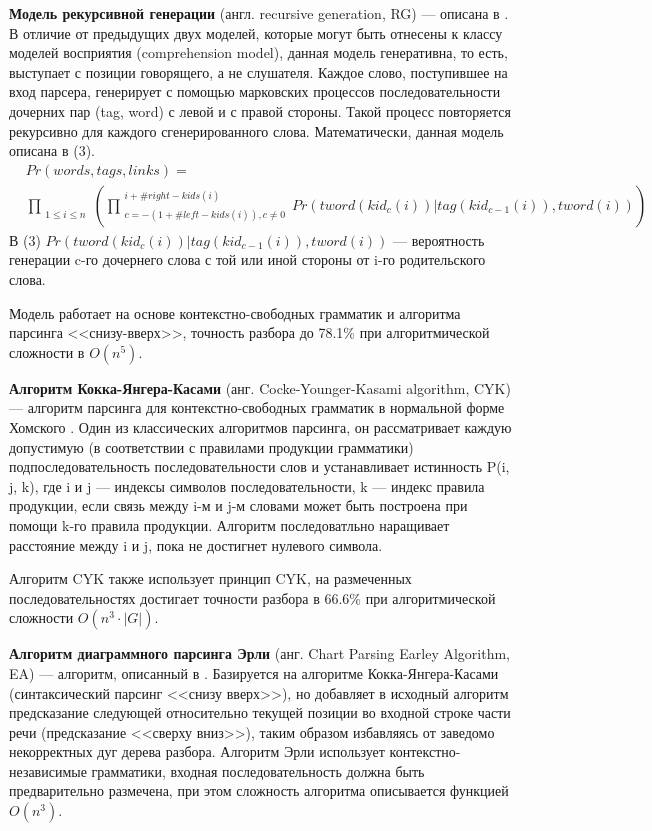 \textbf{Модель рекурсивной генерации} (англ. recursive generation, RG) --- описана в \cite{eisner}. В отличие от предыдущих двух моделей, которые могут быть отнесены к классу моделей восприятия (comprehension model), данная модель генеративна, то есть, выступает с позиции говорящего, а не слушателя. Каждое слово, поступившее на вход парсера, генерирует с помощью марковских процессов последовательности дочерних пар (tag, word) с левой и с правой стороны. Такой процесс повторяется рекурсивно для каждого сгенерированного слова. Математически, данная модель описана в (3).
\begin{equation}\begin{split}
	& Pr(words, tags, links) = \\
	& \prod_{\substack{1 \leq i \leq n}} \left( \prod^{\substack{i + \#right-kids(i)}}_{\substack{c = - (1 + \#left-kids(i)), c \neq 0}} Pr(tword(kid_c(i)) | tag(kid_{c - 1}(i)), tword(i)) \right)
\end{split}\end{equation}
В (3) \(Pr(tword(kid_c(i)) | tag(kid_{c - 1}(i)), tword(i))\) --- вероятность генерации c-го дочернего слова с той или иной стороны от i-го родительского слова.

Модель работает на основе контекстно-свободных грамматик и алгоритма парсинга <<снизу-вверх>>, точность разбора до 78.1\% при алгоритмической сложности в \(O(n^5)\).

\textbf{Алгоритм Кокка-Янгера-Касами} (анг. Cocke-Younger-Kasami algorithm, CYK) --- алгоритм парсинга для контекстно-свободных грамматик в нормальной форме Хомского \cite{wiki_cyk}. Один из классических алгоритмов парсинга, он рассматривает каждую допустимую (в соответствии с правилами продукции грамматики) подпоследовательность последовательности слов и устанавливает истинность P(i, j, k), где i и j --- индексы символов последовательности, k --- индекс правила продукции, если связь между i-м и j-м словами может быть построена при помощи k-го правила продукции. Алгоритм последоватльно наращивает расстояние между i и j, пока не достигнет нулевого символа.

Алгоритм CYK также использует принцип CYK, на размеченных последовательностях достигает точности разбора в 66.6\% при алгоритмической сложности \(O(n^3 \cdot |G|)\).

\textbf{Алгоритм диаграммного парсинга Эрли} (анг. Chart Parsing Earley Algorithm, EA) --- алгоритм, описанный в \cite{webbe}. Базируется на алгоритме Кокка-Янгера-Касами (синтаксический парсинг <<снизу вверх>>), но добавляет в исходный алгоритм предсказание следующей относительно текущей позиции во входной строке части речи (предсказание <<сверху вниз>>), таким образом избавляясь от заведомо некорректных дуг дерева разбора. Алгоритм Эрли использует контекстно-независимые грамматики, входная последовательность должна быть предварительно размечена, при этом сложность алгоритма описывается функцией \(O(n^3)\).

